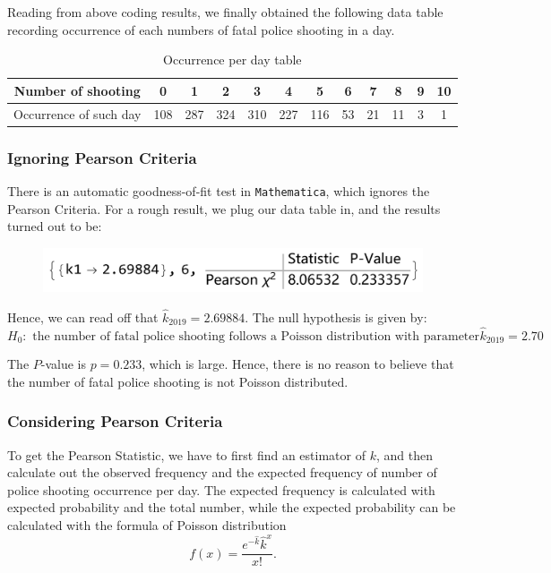 \documentclass[a4paper]{article}
\begin{document}
Reading from above coding results, we finally obtained the following data table recording occurrence of each numbers of fatal police shooting in a day.

\newpage

\begin{table}[!htbp]
\centering
\begin{tabular}{|c|c|c|c|c|c|c|c|c|c|c|c|}
\hline
Number of shooting & 0   & 1   & 2   & 3   & 4   & 5   & 6  & 7  & 8  & 9 & 10 \\ \hline
Occurrence of such day       & 108 & 287 & 324 & 310 & 227 & 116 & 53 & 21 & 11 & 3 & 1  \\ \hline
\end{tabular}
\caption{Occurrence per day table}
\end{table}

\subsubsection{Ignoring Pearson Criteria}
There is an automatic goodness-of-fit test in \texttt{Mathematica}, which ignores the Pearson Criteria. For a rough result, we plug our data table in, and the results turned out to be:

\begin{figure}[!htbp]
\centering
\includegraphics[width=0.6\linewidth]{poissonfit.png}
\end{figure}

Hence, we can read off that $\widehat{k}_{2019}=2.69884$. The null hypothesis is given by:
$$H_0:\text{ the number of fatal police shooting follows a Poisson distribution with parameter }\widehat{k}_{2019}=2.70$$

The $P$-value is $p=0.233$, which is large. Hence, there is no reason to believe that the number of fatal police shooting is not Poisson distributed.

\subsubsection{Considering Pearson Criteria}
To get the Pearson Statistic, we have to first find an estimator of $k$, and then calculate out the observed frequency and the expected frequency of number of police shooting occurrence per day. The expected frequency is calculated with expected probability and the total number, while the expected probability can be calculated with the formula of Poisson distribution
\begin{equation}
f(x)= \frac{e^{-\widehat{k}} \widehat{k}^x}{x!}.
\end{equation}
\end{document}

